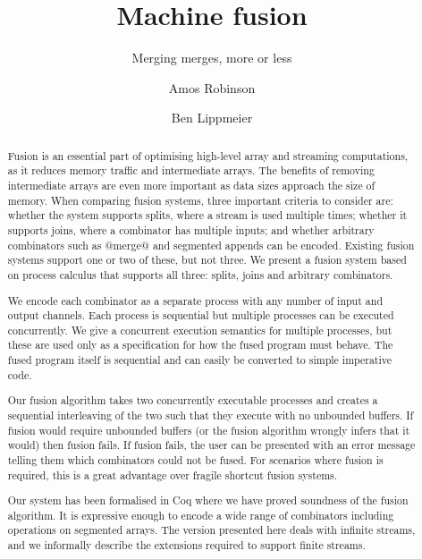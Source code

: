 \documentclass[acmlarge,review,anonymous]{acmart}\settopmatter{printfolios=true}
\begin{document}
\title{Machine fusion}
\subtitle{Merging merges, more or less}

\author{Amos Robinson}

\author{Ben Lippmeier}

\makeatactive
\begin{abstract}

Fusion is an essential part of optimising high-level array and streaming computations, as it reduces memory traffic and intermediate arrays.
The benefits of removing intermediate arrays are even more important as data sizes approach the size of memory.
When comparing fusion systems, three important criteria to consider are: whether the system supports splits, where a stream is used multiple times; whether it supports joins, where a combinator has multiple inputs; and whether arbitrary combinators such as @merge@ and segmented appends can be encoded.
Existing fusion systems support one or two of these, but not three.
We present a fusion system based on process calculus that supports all three: splits, joins and arbitrary combinators.


We encode each combinator as a separate process with any number of input and output channels.
Each process is sequential but multiple processes can be executed concurrently.
We give a concurrent execution semantics for multiple processes, but these are used only as a specification for how the fused program must behave.
The fused program itself is sequential and can easily be converted to simple imperative code.

Our fusion algorithm takes two concurrently executable processes and creates a sequential interleaving of the two such that they execute with no unbounded buffers.
If fusion would require unbounded buffers (or the fusion algorithm wrongly infers that it would) then fusion fails.
If fusion fails, the user can be presented with an error message telling them which combinators could not be fused.
For scenarios where fusion is required, this is a great advantage over fragile shortcut fusion systems.

Our system has been formalised in Coq where we have proved soundness of the fusion algorithm.
It is expressive enough to encode a wide range of combinators including operations on segmented arrays.
The version presented here deals with infinite streams, and we informally describe the extensions required to support finite streams.
\end{abstract}


\maketitle













\end{document}

